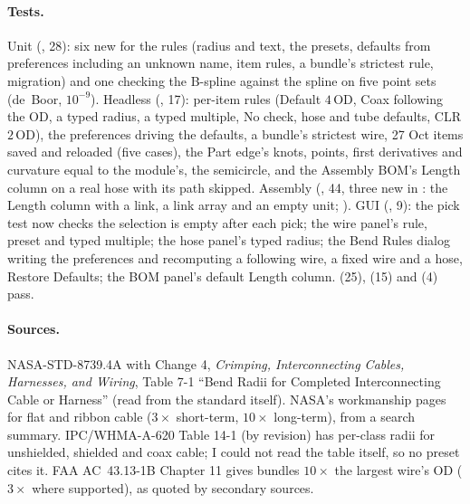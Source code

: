 \paragraph{Tests.} Unit (, 28): six new for the rules (radius and text, the presets, defaults
from preferences including an unknown name, item rules, a bundle's strictest rule, migration) and one checking the
B-spline against the spline on five point sets (de~Boor, $10^{-9}$). Headless (,
17): per-item rules (Default $4\,$OD, Coax following the OD, a typed radius, a typed multiple, No check, hose and
tube defaults, CLR $2\,$OD), the preferences driving the defaults, a bundle's strictest wire, 27 Oct items saved and
reloaded (five cases), the Part edge's knots, points, first derivatives and curvature equal to the module's, the
semicircle, and the Assembly BOM's Length column on a real hose with its path skipped. Assembly
(, 44, three new in : the Length column with a link, a link array and
an empty unit; ). GUI (, 9): the pick test now checks the selection is
empty after each pick; the wire panel's rule, preset and typed multiple; the hose panel's typed radius; the Bend
Rules dialog writing the preferences and recomputing a following wire, a fixed wire and a hose, Restore Defaults; the
BOM panel's default Length column.  (25),  (15) and
 (4) pass.

\paragraph{Sources.} NASA-STD-8739.4A with Change 4, \emph{Crimping, Interconnecting Cables, Harnesses, and Wiring},
Table 7-1 ``Bend Radii for Completed Interconnecting Cable or Harness'' (read from the standard itself). NASA's
workmanship pages for flat and ribbon cable ($3\times$ short-term, $10\times$ long-term), from a search summary.
IPC/WHMA-A-620 Table 14-1 (by revision) has per-class radii for unshielded, shielded and coax cable; I could not
read the table itself, so no preset cites it. FAA AC~43.13-1B Chapter 11 gives bundles $10\times$ the largest wire's
OD ($3\times$ where supported), as quoted by secondary sources.

